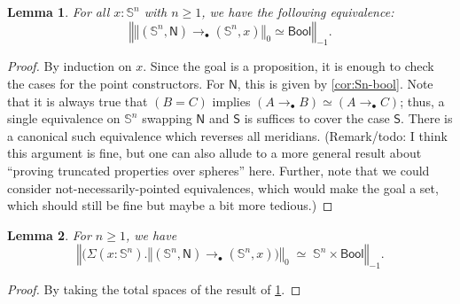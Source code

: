 \documentclass[11pt,a4paper,oneside,reqno]{amsart}
\newtheorem{theorem}{Theorem}
\newtheorem{lemma}[theorem]{Lemma}
\theoremstyle{definition}
\theoremstyle{remark}
\newcommand{\sph}[1]{{\mathbb S}^{#1}}
\newcommand{\trunc}[2]{\mathopen{}\left\Vert #2\right\Vert_{#1}\mathclose{}}
\newcommand{\North}{\mathsf N}
\newcommand{\South}{\mathsf S}
\begin{document}
% 
% 

\begin{lemma} \label{lem:eqv-to-bool}
 For all $x : \sph n$ with $n \geq 1$, we have the following equivalence:
 \begin{equation}
  \trunc {-1} {\trunc 0 {(\sph n, \North) \to_\bullet (\sph n, x)} \simeq \mathsf{Bool}}.
 \end{equation}
\end{lemma}
\begin{proof}
 By induction on $x$.
 Since the goal is a proposition, it is enough to check the cases for the point constructors. For $\North$, this is given by 
 \cref{cor:Sn-bool}. Note that it is always true that $(B = C)$ implies $(A \to_\bullet B) \simeq (A \to_\bullet C)$;
 thus, a single equivalence on $\sph n$ swapping $\North$ and $\South$ is suffices to cover the case $\South$.
 There is a canonical such equivalence which reverses all meridians.
 (Remark/todo: I think this argument is fine, but one can also allude to a more general result about ``proving truncated properties over spheres'' here. Further, note that we could consider not-necessarily-pointed equivalences, which would make the goal a set, which should still be fine but maybe a bit more tedious.)
\end{proof}

\begin{lemma} \label{lem:sn-bool}
 For $n \geq 1$, we have
 \begin{equation}
  \trunc {-1} {\big(\Sigma (x : \sph n). \trunc 0 {(\sph n , \North) \to_\bullet (\sph n, x)\big)} \; \simeq \; \sph n \times \mathsf{Bool}}.
 \end{equation}
\end{lemma}
\begin{proof}
 By taking the total spaces of the result of \cref{lem:eqv-to-bool}.
\end{proof}
\end{document}
